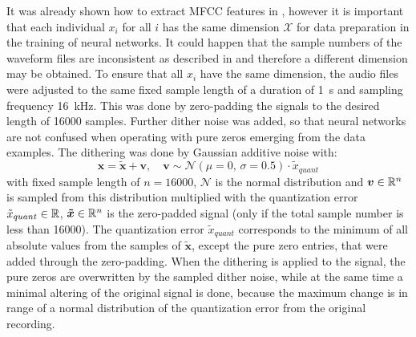 It was already shown how to extract MFCC features in , however it is important that each individual $x_i$ for all $i$ has the same dimension $\mathcal{X}$ for data preparation in the training of neural networks.
It could happen that the sample numbers of the waveform files are inconsistent as described in  and therefore a different dimension may be obtained.
To ensure that all $x_i$ have the same dimension, the audio files were adjusted to the same fixed sample length of a duration of \SI{1}{\second} and sampling frequency \SI{16}{\kilo\hertz}.
This was done by zero-padding the signals to the desired length of 16000 samples.
Further dither noise was added, so that neural networks are not confused when operating with pure zeros emerging from the data examples.
The dithering was done by Gaussian additive noise with:
\begin{equation}\label{eq:exp_dither}
  \bm{x} = \bm{\tilde{x}} + \bm{v}, \quad \bm{v} \sim \mathcal{N}(\mu=0, \, \sigma=0.5) \cdot \tilde{x}_{quant}%
\end{equation}
with fixed sample length of $n = 16000$, $\mathcal{N}$ is the normal distribution and $\bm{v} \in \mathbb{R}^n$ is sampled from this distribution multiplied with the quantization error $\tilde{x}_{quant} \in \mathbb{R}$, $\bm{\tilde{x}} \in \mathbb{R}^n$ is the zero-padded signal (only if the total sample number is less than 16000).
The quantization error $\tilde{x}_{quant}$ corresponds to the minimum of all absolute values from the samples of $\bm{\tilde{x}}$, except the pure zero entries, that were added through the zero-padding.
When the dithering is applied to the signal, the pure zeros are overwritten by the sampled dither noise, while at the same time a minimal altering of the original signal is done, because the maximum change is in range of a normal distribution of the quantization error from the original recording.
